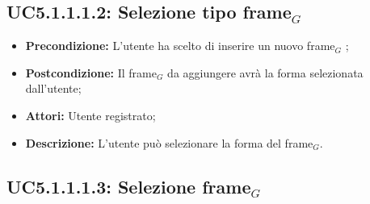 \subsection{ UC5.1.1.1.2: Selezione tipo frame$_G$ }

\begin{itemize}
	\item \textbf{Precondizione:} L'utente ha scelto di inserire un nuovo frame$_G$ ;
	\item \textbf{Postcondizione:} Il frame$_G$ da aggiungere avrà la forma selezionata dall'utente;
	\item \textbf{Attori:} Utente registrato;
	\item \textbf{Descrizione:} L'utente può selezionare la forma del frame$_G$.
\end{itemize}
\subsection{ UC5.1.1.1.3: Selezione frame$_G$}


